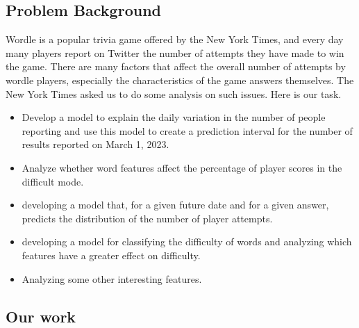 \documentclass[12pt]{article}  %
\begin{document}
\subsection{Problem Background}
Wordle is a popular trivia game offered by the New York Times, and every day many players report on Twitter the number of attempts they have made to win the game. There are many factors that affect the overall number of attempts by wordle players, especially the characteristics of the game answers themselves. The New York Times asked us to do some analysis on such issues. Here is our task.
\begin{itemize}
	\item  Develop a model to explain the daily variation in the number of people reporting and use this model to create a prediction interval for the number of results reported on March 1, 2023.
	\item  Analyze whether word features affect the percentage of player scores in the difficult mode.
	\item  developing a model that, for a given future date and for a given answer, predicts the distribution of the number of player attempts.
	\item  developing a model for classifying the difficulty of words and analyzing which features have a greater effect on difficulty.
	\item  Analyzing some other interesting features.
\end{itemize}
	\subsection{Our work}
\end{document}
